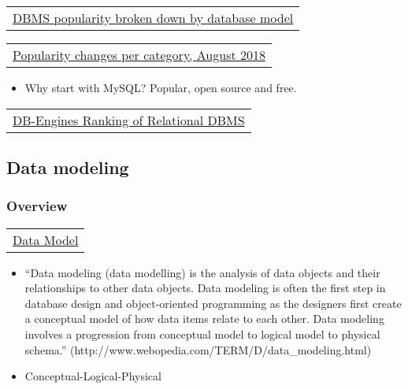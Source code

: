 \documentclass[11pt]{article}
\providecommand{\tightlist}{%
      \setlength{\itemsep}{0pt}\setlength{\parskip}{0pt}}
\begin{document}
\begin{longtable}[]{@{}c@{}}
\toprule
\tabularnewline
\midrule
\endhead
\href{https://db-engines.com/en/ranking_categories}{DBMS popularity
broken down by database model}\tabularnewline
\bottomrule
\end{longtable}

\begin{longtable}[]{@{}c@{}}
\toprule
\tabularnewline
\midrule
\endhead
\href{https://db-engines.com/en/ranking_categories}{Popularity changes
per category, August 2018}\tabularnewline
\bottomrule
\end{longtable}

    \begin{itemize}
\tightlist
\item
  Why start with MySQL? Popular, open source and free.
\end{itemize}

\begin{longtable}[]{@{}c@{}}
\toprule
\tabularnewline
\midrule
\endhead
\href{https://db-engines.com/en/ranking/relational+dbms}{DB-Engines
Ranking of Relational DBMS}\tabularnewline
\bottomrule
\end{longtable}

    \subsection{Data modeling}\label{data-modeling}

\subsubsection{Overview}\label{overview}

\begin{longtable}[]{@{}c@{}}
\toprule
\tabularnewline
\midrule
\endhead
\href{https://en.wikipedia.org/wiki/Data_model}{Data
Model}\tabularnewline
\bottomrule
\end{longtable}

\begin{itemize}
\item
  ``Data modeling (data modelling) is the analysis of data objects and
  their relationships to other data objects. Data modeling is often the
  first step in database design and object-oriented programming as the
  designers first create a conceptual model of how data items relate to
  each other. Data modeling involves a progression from conceptual model
  to logical model to physical schema.''
  (http://www.webopedia.com/TERM/D/data\_modeling.html)
\item
  Conceptual-Logical-Physical
\end{itemize}
\end{document}
